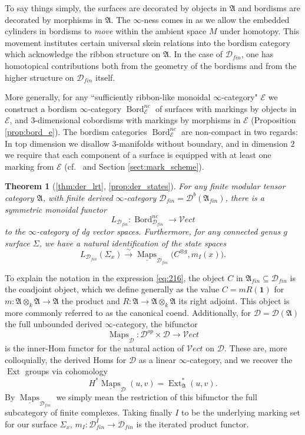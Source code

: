 \documentclass[reqno]{amsart}
\newtheorem*{theoremA}{Theorem}
\theoremstyle{definition}
\newcommand{\mfk}[1]{\mathfrak{#1}}
\newcommand{\msc}[1]{\mathscr{#1}}
\newcommand{\ot}{\otimes}
\newcommand{\Vect}{\msc{V}\!ect}
\DeclareMathOperator{\Ext}{Ext}
\DeclareMathOperator{\Maps}{Maps}
\DeclareMathOperator{\Bord}{Bord}
\renewcommand{\1}{\mathbf{1}}
\begin{document}
To say things simply, the surfaces are decorated by objects in $\mfk{A}$ and bordisms are decorated by morphisms in $\mfk{A}$.  The $\infty$-ness comes in as we allow the embedded cylinders in bordisms to \emph{move} within the ambient space $M$ under homotopy. This movement institutes certain universal skein relations into the bordism category which acknowledge the ribbon structure on $\mfk{A}$. In the case of $\msc{D}_{fin}$, one has homotopical contributions both from the geometry of the bordisms and from the higher structure on $\msc{D}_{fin}$ itself. 

More generally, for any ``sufficiently ribbon-like monoidal $\infty$-category" $\msc{E}$ we construct a bordism $\infty$-category $\Bord_{\msc{E}}^{nc}$ of surfaces with markings by objects in $\msc{E}$, and $3$-dimensional cobordisms with markings by morphisms in $\msc{E}$ (Proposition \ref{prop:bord_e}). The bordism categories $\Bord_{\msc{E}}^{nc}$ are non-compact in two regards: In top dimension we disallow $3$-manifolds without boundary, and in dimension $2$ we require that each component of a surface is equipped with at least one marking from $\msc{E}$ (cf.\ \cite{derenzi21} and Section \ref{sect:mark_scheme}).

\begin{theoremA}[\ref{thm:der_lrt}, \ref{prop:der_states}]
For any finite modular tensor category $\mfk{A}$, with finite derived $\infty$-category $\msc{D}_{fin}=\msc{D}^b(\mfk{A}_{fin})$, there is a symmetric monoidal functor
\begin{equation}\label{eq:218}
L_{\msc{D}_{fin}}:\Bord_{\msc{D}_{fin}}^{nc}\to \Vect
\end{equation}
to the $\infty$-category of dg vector spaces.  Furthermore, for any connected genus $g$ surface $\Sigma$, we have a natural identification of the state spaces
\begin{equation}\label{eq:216}
L_{\msc{D}_{fin}}(\Sigma_x)\overset{\sim}\to \underline{\Maps}_{\msc{D}_{fin}}\big(C^{\ot g},m_I(x)\big).
\end{equation}
\end{theoremA}

To explain the notation in the expression \eqref{eq:216}, the object $C$ in $\mfk{A}_{fin}\subseteq \msc{D}_{fin}$ is the coadjoint object, which we define generally as the value $C=mR(\1)$ for $m:\mfk{A}\ot_k \mfk{A}\to \mfk{A}$ the product and $R:\mfk{A}\to \mfk{A}\ot_k \mfk{A}$ its right adjoint. This object is more commonly referred to as the canonical coend. Additionally, for $\msc{D}=\msc{D}(\mfk{A})$ the full unbounded derived $\infty$-category, the bifunctor
\[
\underline{\Maps}_{\msc{D}}:\msc{D}^{op}\times \msc{D}\to \Vect
\]
is the inner-Hom functor for the natural action of $\Vect$ on $\msc{D}$.  These are, more colloquially, the derived Homs for $\msc{D}$ as a linear $\infty$-category, and we recover the $\Ext$ groups via cohomology
\[
H^{\ast}\underline{\Maps}_{\msc{D}}(u,v)=\Ext^{\ast}_{\mfk{A}}(u,v).
\]
By $\underline{\Maps}_{\msc{D}_{fin}}$ we simply mean the restriction of this bifunctor the full subcategory of finite complexes.  Taking finally $I$ to be the underlying marking set for our surface $\Sigma_x$, $m_I:\msc{D}_{fin}^I\to \msc{D}_{fin}$ is the iterated product functor.
\end{document}

